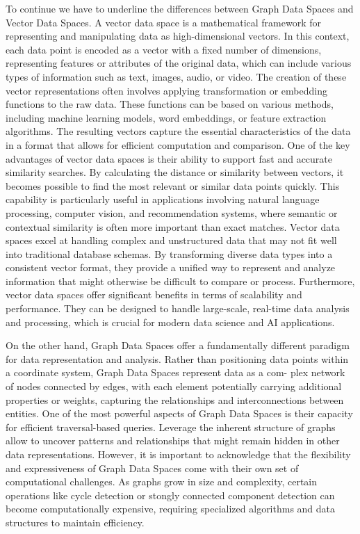 To continue we have to underline the differences between Graph Data Spaces and Vector Data Spaces. A vector data space is a mathematical framework for representing and manipulating data as high-dimensional vectors. In this context, each data point is encoded as a vector with a fixed number of dimensions, representing features or attributes of the original data, which can include various types of information such as text, images, audio, or video. The creation of these vector representations often involves applying transformation or embedding functions to the raw data. These functions can be based on various methods, including machine learning models, word embeddings, or feature extraction algorithms. The resulting vectors capture the essential characteristics of the data in a format that allows for efficient computation and comparison. One of the key advantages of vector data spaces is their ability to support fast and accurate similarity searches. By calculating the distance or similarity between vectors, it becomes possible to find the most relevant or similar data points quickly. This capability is particularly useful in applications involving natural language processing, computer vision, and recommendation systems, where semantic or contextual similarity is often more important than exact matches. Vector data spaces excel at handling complex and unstructured data that may not fit well into traditional database schemas. By transforming diverse data types into a consistent vector format, they provide a unified way to represent and analyze information that might otherwise be difficult to compare or process. Furthermore, vector data spaces offer significant benefits in terms of scalability and performance. They can be designed to handle large-scale, real-time data analysis and processing, which is crucial for modern data science and AI applications.

On the other hand, Graph Data Spaces offer a fundamentally different paradigm for data representation and analysis. Rather than positioning data points within a coordinate system, Graph Data Spaces represent data as a com- plex network of nodes connected by edges, with each element potentially carrying additional properties or weights, capturing the relationships and interconnections between entities. One of the most powerful aspects of Graph Data Spaces is their capacity for efficient traversal-based queries. Leverage the inherent structure of graphs allow to uncover patterns and relationships that might remain hidden in other data representations. However, it is important to acknowledge that the flexibility and expressiveness of Graph Data Spaces come with their own set of computational challenges. As graphs grow in size and complexity, certain operations like cycle detection or stongly connected component detection can become computationally expensive, requiring specialized algorithms and data structures to maintain efficiency.


